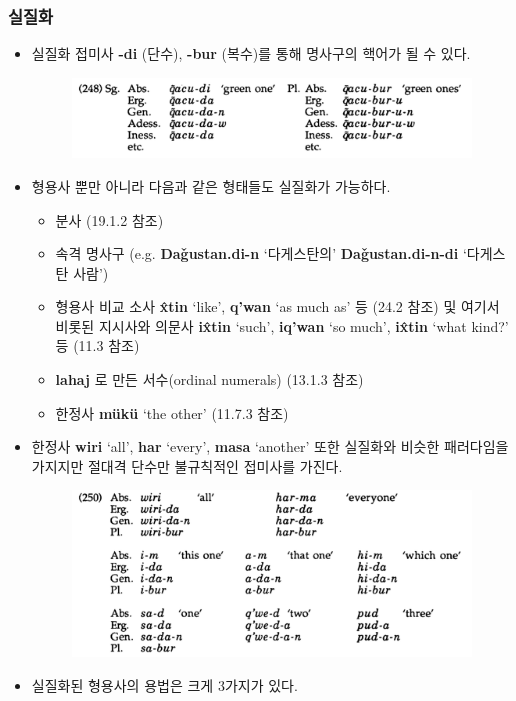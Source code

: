 \subsubsection{실질화}
\begin{itemize}
\item 실질화 접미사 \textbf{-di} (단수), \textbf{-bur} (복수)를 통해 명사구의 핵어가 될 수 있다.
\begin{figure}[H]
\centerline{\includegraphics[width=.8\linewidth]{Lezgian/src/ex248.png}}
\end{figure}
\item 형용사 뿐만 아니라 다음과 같은 형태들도 실질화가 가능하다. 
\begin{itemize}
\item 분사 (19.1.2 참조)
\item 속격 명사구 (e.g. \textbf{Da\v{g}ustan.di-n} `다게스탄의' \textbf{Da\v{g}ustan.di-n-di} `다게스탄 사람')
\item 형용사 비교 소사 \textbf{\^xtin} `like', \textbf{q'wan} `as much as' 등 (24.2 참조) 및 여기서 비롯된 지시사와 의문사 \textbf{i\^xtin} `such', \textbf{iq'wan} `so much', \textbf{i\^xtin} `what kind?' 등 (11.3 참조)
\item \textbf{lahaj} 로 만든 서수(ordinal numerals) (13.1.3 참조)
\item 한정사 \textbf{mükü} `the other' (11.7.3 참조)
\end{itemize}
\item 한정사 \textbf{wiri} `all', \textbf{har} `every', \textbf{masa} `another' 또한 실질화와 비슷한 패러다임을 가지지만 절대격 단수만 불규칙적인 접미사를 가진다.
\begin{figure}[H]
\centerline{\includegraphics[width=.8\linewidth]{Lezgian/src/ex250.png}}
\end{figure}
\item 실질화된 형용사의 용법은 크게 3가지가 있다.

\end{itemize}
